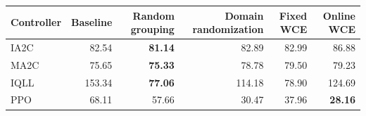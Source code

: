 \begin{tabular}{lrrrrr}
\hline
Controller & Baseline & Random grouping & Domain randomization & Fixed WCE & Online WCE \\
\hline
IA2C & 82.54 & \textbf{81.14} & 82.89 & 82.99 & 86.88 \\
MA2C & 75.65 & \textbf{75.33} & 78.78 & 79.50 & 79.23 \\
IQLL & 153.34 & \textbf{77.06} & 114.18 & 78.90 & 124.69 \\
PPO & 68.11 & 57.66 & 30.47 & 37.96 & \textbf{28.16} \\
\hline
\end{tabular}
